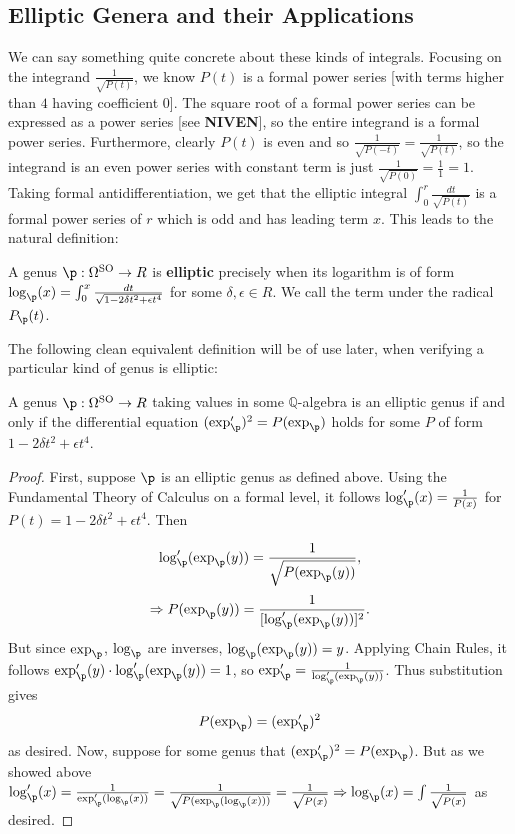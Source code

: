 \subsection{Elliptic Genera and their Applications}

We can say something quite concrete about these kinds of integrals. Focusing on the integrand $\frac{1}{\sqrt{P(t)}}$, we know $P(t)$ is a formal power series [with terms higher than $4$ having coefficient $0$]. The square root of a formal power series can be expressed as a power series [see \textbf{NIVEN}], so the entire integrand is a formal power series. Furthermore, clearly $P(t)$ is even and so $\frac{1}{\sqrt{P(-t)}} = \frac{1}{\sqrt{P(t)}}$, so the integrand is an even power series with constant term is just $\frac{1}{\sqrt{P(0)}} = \frac{1}{1} = 1$. Taking formal antidifferentiation, we get that the elliptic integral  $\int_0^r \frac{dt}{\sqrt{P(t)}}$ is a formal power series of $r$  which is odd and has leading term $x$. This leads to the natural definition:

\begin{definition}
    A genus $\p: \Omega^{\text{SO}} \to R$ is \textbf{elliptic} precisely when its logarithm is of form $\log_\p (x) = \int_0^x \frac{dt}{\sqrt{1 - 2 \delta t^2 + \epsilon t^4}}$ for some $\delta, \epsilon \in R$. We call the term under the radical $P_\p (t)$.
\end{definition}

The following clean equivalent definition will be of use later, when verifying a particular kind of genus is elliptic: 
\begin{proposition}
    A genus $\p: \Omega^{\text{SO}} \to R$ taking values in some $\mathbb{Q}$-algebra is an elliptic genus if and only if the differential equation $(\exp_\p ')^2 = P(\exp_\p)$ holds for some $P$ of form $1 - 2 \delta t^2 + \epsilon t^4$.
\end{proposition}

\begin{proof}
First, suppose $\p$ is an elliptic genus as defined above. Using the Fundamental Theory of Calculus on a formal level, it follows $\log_\p'(x) = \frac{1}{P(x)}$ for $P(t) = 1 - 2 \delta t^2 + \epsilon t^4$. Then

\[\log'_\p (\exp_\p(y)) = \frac{1}{\sqrt{P(\exp_\p (y))}},\]
\[\Rightarrow P (\exp_\p (y)) = \frac{1}{ [\log'_\p (\exp_\p(y))]^2} .\]
But since $\exp_\p$, $\log_\p$ are inverses, $\log_\p (\exp_\p (y)) = y$.  Applying Chain Rules, it follows $\exp_\p' (y) \cdot \log_\p' (\exp_\p (y)) = 1$, so $\exp'_\p = \frac{1}{\log_\p' (\exp_\p (y)) }$. Thus substitution gives
\[P(\exp_\p) = (\exp_\p')^2\]
as desired. Now, suppose for some genus that  $(\exp_\p ')^2 = P(\exp_\p)$. But as we showed above $\log_\p'(x)  = \frac{1}{\exp_\p' (\log_\p(x))} = \frac{1}{\sqrt{P(\exp_\p (\log_\p (x)))}} = \frac{1}{\sqrt{P(x)}} \Rightarrow \log_\p (x) = \int \frac{1}{\sqrt{P(x)}}$ as desired. 
\end{proof}

